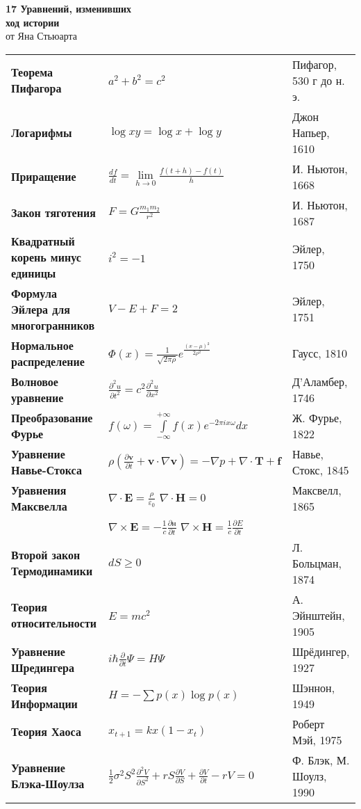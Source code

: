 \documentclass[12pt]{article}
\begin{document}
  \begin{flushleft}
  \textbf{\Large{17 Уравнений, изменивших\\ ход истории}} \\
  \large{от Яна Стьюарта}
  \end{flushleft}
\begin{tabular}{l l l}
  \textbf{Теорема Пифагора} & $a^2+b^2=c^2$ & Пифагор, 530 г до н. э. \\
  \textbf{Логарифмы} & ${\log xy} = {\log x} + {\log y}$ & Джон Напьер, 1610 \\
  \textbf{Приращение} & $\frac{df}{dt} =\lim \limits_{h \to 0}\frac{f(t+h)-f(t)}{h}$ & И. Ньютон, 1668 \\
  \textbf{Закон тяготения} & $F = G\frac{m_1 m_2}{r^2}$ & И. Ньютон, 1687 \\
  \textbf{Квадратный корень минус единицы} & $i^2 = -1$ & Эйлер, 1750 \\
  \textbf{Формула Эйлера для многогранников} & $V - E + F = 2$ & Эйлер, 1751 \\
  \textbf{Нормальное распределение} & $\Phi(x) = \frac1{\sqrt{2\pi \rho}} e^{\frac{(x-\mu)^2}{2 \rho^2}}$ & Гаусс, 1810 \\
  \textbf{Волновое уравнение} & $\frac{\partial^2 u}{\partial t^2} = c^2\frac{\partial^2 u}{\partial x^2}$ & Д'Аламбер, 1746 \\
  \textbf{Преобразование Фурье} & $f(\omega) = \int \limits_{-\infty}^{+\infty}f(x)e^{-2\pi i x \omega}dx$ & Ж. Фурье, 1822 \\
  \textbf{Уравнение Навье-Стокса} & $\rho \left( \frac{\partial \textbf{v}}{\partial t} +\textbf{v} \cdot \nabla \textbf{v} \right) = -\nabla p + \nabla \cdot \textbf{T} + \textbf{f}$ & Навье, Стокс, 1845 \\
  \textbf{Уравнения Максвелла} & $\nabla \cdot \textbf{E} = \frac \rho{\varepsilon_0}$ \qquad $\nabla \cdot \textbf{H} = 0$  & Максвелл, 1865 \\
                      & $\nabla \times \textbf{E} = -\frac1{c} \frac{\partial \textbf{н}}{\partial t}$ \qquad $\nabla \times \textbf{H} = \frac 1{c} \frac{\partial E}{\partial t}$ &  \\
  \textbf{Второй закон Термодинамики} & $dS \geq 0$ & Л. Больцман, 1874 \\
  \textbf{Теория относительности} & $E = mc^2$ & А. Эйнштейн, 1905 \\
  \textbf{Уравнение Шредингера} & $i\hbar \frac{\partial}{\partial t}\Psi=H\Psi$ & Шрёдингер, 1927 \\
  \textbf{Теория Информации} & $H = -\sum p(x) {\log p(x)}$ & Шэннон, 1949 \\
  \textbf{Теория Хаоса} & $x_{t+1} = kx(1-x_t)$ & Роберт Мэй, 1975 \\
  \textbf{Уравнение Блэка-Шоулза} & $\frac 1{2}\sigma^2 S^2 \frac{\partial^2 V}{\partial S^2} + rS \frac{\partial V}{\partial S} + \frac{\partial V}{\partial t} - rV = 0$ & Ф. Блэк, М. Шоулз, 1990 \\
\end{tabular}
\end{document}
